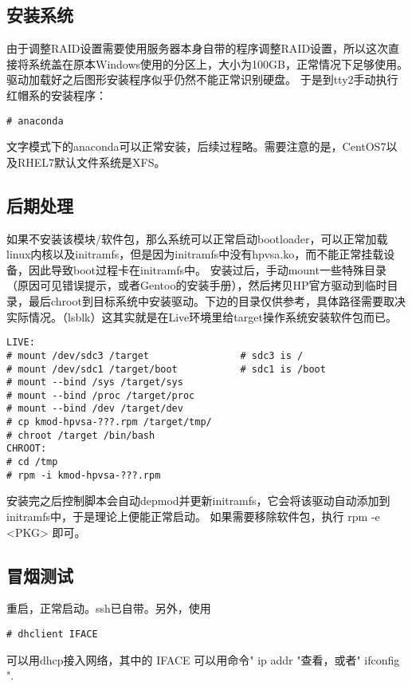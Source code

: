 \documentclass[a4paper,12pt]{article}
\begin{document}
\begin{CJK}{UTF8}{gbsn}
	\subsection{安装系统}
	由于调整RAID设置需要使用服务器本身自带的程序调整RAID设置，所以这次直接将系统盖在原本Windows使用的分区上，大小为100GB，正常情况下足够使用。
	\newline
	驱动加载好之后图形安装程序似乎仍然不能正常识别硬盘。
	于是到tty2手动执行红帽系的安装程序：
	\begin{verbatim}
# anaconda
	\end{verbatim}
	文字模式下的anaconda可以正常安装，后续过程略。需要注意的是，CentOS7以及RHEL7默认文件系统是XFS。

	\subsection{后期处理}
	如果不安装该模块/软件包，那么系统可以正常启动bootloader，可以正常加载linux内核以及initramfs，但是因为initramfs中没有hpvsa.ko，而不能正常挂载设备，因此导致boot过程卡在initramfs中。
	\newline
	安装过后，手动mount一些特殊目录（原因可见错误提示，或者Gentoo的安装手册），然后拷贝HP官方驱动到临时目录，最后chroot到目标系统中安装驱动。下边的目录仅供参考，具体路径需要取决实际情况。（lsblk）这其实就是在Live环境里给target操作系统安装软件包而已。
	\begin{verbatim}
LIVE:
# mount /dev/sdc3 /target                # sdc3 is /
# mount /dev/sdc1 /target/boot           # sdc1 is /boot
# mount --bind /sys /target/sys
# mount --bind /proc /target/proc
# mount --bind /dev /target/dev
# cp kmod-hpvsa-???.rpm /target/tmp/
# chroot /target /bin/bash
CHROOT:
# cd /tmp
# rpm -i kmod-hpvsa-???.rpm
	\end{verbatim}
	安装完之后控制脚本会自动depmod并更新initramfs，它会将该驱动自动添加到initramfs中，于是理论上便能正常启动。
	如果需要移除软件包，执行 rpm -e <PKG> 即可。

	\subsection{冒烟测试}
	重启，正常启动。ssh已自带。另外，使用
	\begin{verbatim}
# dhclient IFACE
	\end{verbatim}
	可以用dhcp接入网络，其中的 IFACE 可以用命令" ip addr "查看，或者" ifconfig ".


\end{CJK}
\end{document}
